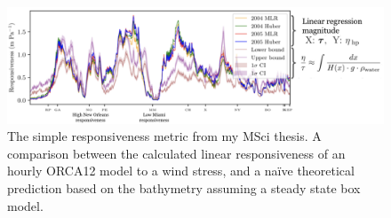 \documentclass[usenames, dvipsnames]{article}      %
\begin{document}
\begin{figure}[htb!]
    \centering
    \includegraphics[width=1.1\linewidth]{img.png}
    \caption{The simple responsiveness metric from my MSci thesis. 
        A comparison between the calculated linear responsiveness
        of an hourly ORCA12 model to a wind stress, 
        and a na\"ive theoretical prediction based on 
        the bathymetry assuming a steady state box model.}
        \vspace{-10pt}
    \label{fig:responsiveness}
\end{figure}
\end{document}
